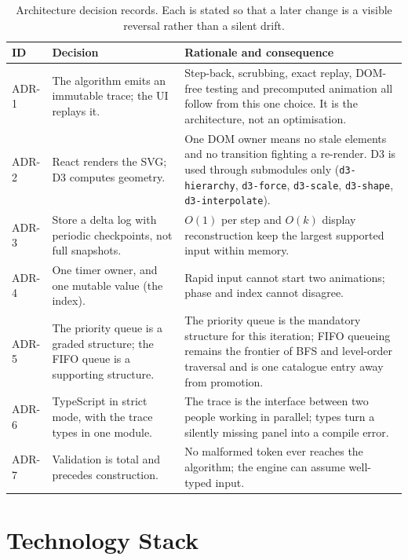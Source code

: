\documentclass[11pt,a4paper]{article}
\newcommand{\ct}[1]{\texttt{#1}}
\begin{document}
\begin{table}[H]
\centering
\small
\setlength{\tabcolsep}{4pt}
\begin{tabular}{@{}L{1.3cm}L{4.5cm}L{9.4cm}@{}}
\toprule
\textbf{ID} & \textbf{Decision} & \textbf{Rationale and consequence} \\
\midrule
ADR-1 & The algorithm emits an immutable trace; the UI replays it. & Step-back, scrubbing, exact
replay, DOM-free testing and precomputed animation all follow from this one choice. It is the
architecture, not an optimisation. \\
ADR-2 & React renders the SVG; D3 computes geometry. & One DOM owner means no stale elements and no
transition fighting a re-render. D3 is used through submodules only (\ct{d3-hierarchy},
\ct{d3-force}, \ct{d3-scale}, \ct{d3-shape}, \ct{d3-interpolate}). \\
ADR-3 & Store a delta log with periodic checkpoints, not full snapshots. & $O(1)$ per step and
$O(k)$ display reconstruction keep the largest supported input within memory. \\
ADR-4 & One timer owner, and one mutable value (the index). & Rapid input cannot start two
animations; phase and index cannot disagree. \\
ADR-5 & The priority queue is a graded structure; the FIFO queue is a supporting structure. & The
priority queue is the mandatory structure for this iteration; FIFO queueing remains the frontier of
BFS and level-order traversal and is one catalogue entry away from promotion. \\
ADR-6 & TypeScript in strict mode, with the trace types in one module. & The trace is the interface
between two people working in parallel; types turn a silently missing panel into a compile error. \\
ADR-7 & Validation is total and precedes construction. & No malformed token ever reaches the
algorithm; the engine can assume well-typed input. \\
\bottomrule
\end{tabular}
\caption{Architecture decision records. Each is stated so that a later change is a visible reversal
rather than a silent drift.}
\end{table}

\section{Technology Stack}
\end{document}
